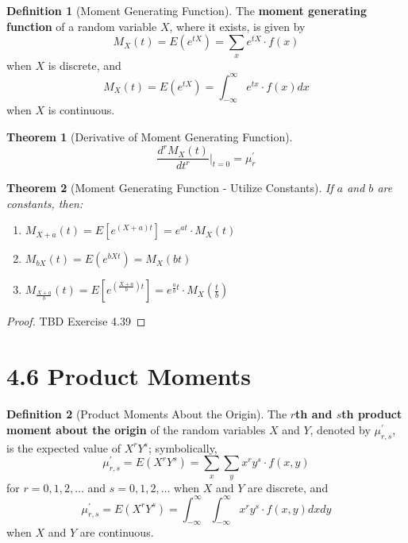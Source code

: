 \documentclass[
10pt,reqno
]{amsart}
\newtheorem{theorem}{Theorem}[section]
\theoremstyle{definition}
\newtheorem{definition}{Definition}[section]
\begin{document}
\begin{definition}[Moment Generating Function]
The \textbf{moment generating function} of a random variable \(X\), where it exists, is given by
\[
M_X(t)= E(e^{tX}) = \sum_x e^{tX} \cdot f(x)
\]
when \(X\) is discrete, and 
\[
M_X(t)= E(e^{tX}) = \int_{- \infty}^{\infty}e^{tx} \cdot f(x) dx
\]
when \(X\) is continuous.
\end{definition}

\begin{theorem}[Derivative of Moment Generating Function]
\[
\frac{d^r M_X(t)}{dt^r} \Bigg \vert _{t=0}=\mu_r^{'}
\]
\end{theorem}

\begin{theorem}[Moment Generating Function - Utilize Constants]
If \(a\) and \(b\) are constants, then:
\begin{enumerate}
	\item \( M_{X+a}(t) = E [e^{(X + a)t}] = e^{at} \cdot M_X (t)\)
	\item \( M_{bX}(t) = E (e^{bXt}) = M_X (bt)\)
	\item \( M_{\frac{X+a}{b}}(t) = E [e^{(\frac{X + a}{b})t}] = e^{\frac{a}{b}t} \cdot M_X (\frac{t}{b})\)
\end{enumerate}
\end{theorem}

\begin{proof}
TBD Exercise 4.39
\end{proof}

\section*{4.6 Product Moments}

\begin{definition}[Product Moments About the Origin]
The \textbf{\(r\)th and \(s\)th product moment about the origin} of the random variables \(X\) and \(Y\), denoted by \(\mu^{'}_{r,s}\), is the expected value of \(X^r Y^s\); symbolically,
\[
\mu^{'}_{r,s}= E(X^r Y^s)=\sum_x \sum_y x^r y^s \cdot f(x,y)
\]
for \(r=0,1,2, \ldots \) and \(s=0,1,2,\ldots\) when \(X\) and \(Y\) are discrete, and
\[
\mu^{'}_{r,s}= E(X^r Y^s)=\int_{- \infty}^{\infty} \int_{- \infty}^{\infty} x^r y^s \cdot f(x,y) dx dy
\]
when \(X\) and \(Y\) are continuous.
\end{definition}
\end{document}
